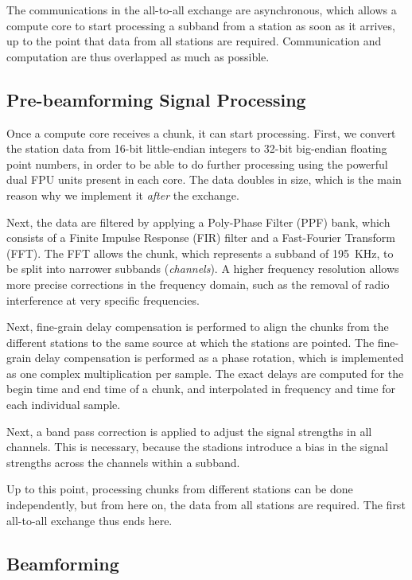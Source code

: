 \documentclass{llncs}
\begin{document}
The communications in the all-to-all exchange are asynchronous, which allows a compute core to start processing a subband from a station as soon as it arrives, up to the point that data from all stations are required. Communication and computation are thus overlapped as much as possible.

\subsection{Pre-beamforming Signal Processing}

Once a compute core receives a chunk, it can start processing. First, we convert the station data from 16-bit little-endian integers to 32-bit big-endian floating point numbers, in order to be able to do further processing using the powerful dual FPU units present in each core. The data doubles in size, which is the main reason why we implement it \emph{after} the exchange.

Next, the data are filtered by applying a Poly-Phase Filter (PPF) bank, which consists of a Finite Impulse Response (FIR) filter and a Fast-Fourier Transform (FFT). The FFT allows the chunk, which represents a subband of 195~KHz, to be split into narrower subbands (\emph{channels}). A higher frequency resolution allows more precise corrections in the frequency domain, such as the removal of radio interference at very specific frequencies.

Next, fine-grain delay compensation is performed to align the chunks from the different stations to the same source at which the stations are pointed. The fine-grain delay compensation is performed as a phase rotation, which is implemented as one complex multiplication per sample. The exact delays are computed for the begin time and end time of a chunk, and interpolated in frequency and time for each individual sample. %

Next, a band pass correction is applied to adjust the signal strengths in all channels. This is necessary, because the stadions introduce a bias in the signal strengths across the channels within a subband.

Up to this point, processing chunks from different stations can be done independently, but from here on, the data from all stations are required. The first all-to-all exchange thus ends here.

\subsection{Beamforming}
\end{document}
